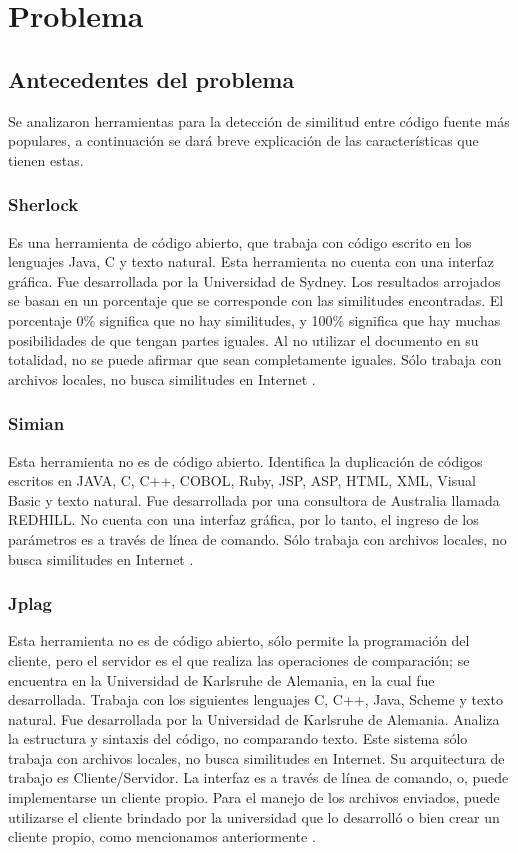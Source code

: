 \section{Problema}
\subsection{Antecedentes del problema}
Se analizaron herramientas para la detección de similitud entre código fuente más populares, a continuación se dará breve explicación de las características que tienen estas.
\subsubsection{Sherlock}
Es una herramienta de código abierto, que trabaja con código escrito en los lenguajes Java, C y texto natural. Esta herramienta no cuenta con una interfaz gráfica. Fue desarrollada por la Universidad de Sydney. Los resultados arrojados se basan en un porcentaje que se corresponde con las similitudes encontradas. El porcentaje 0\% significa que no hay similitudes, y 100\% significa que hay muchas posibilidades de que tengan partes iguales. Al no utilizar el documento en su totalidad, no se puede afirmar que sean completamente iguales. Sólo trabaja con archivos locales, no busca similitudes en Internet \cite{article1}.
\subsubsection{Simian}
Esta herramienta no es de código abierto. Identifica la duplicación de códigos escritos en JAVA, C, C++, COBOL, Ruby, JSP, ASP, HTML, XML, Visual Basic y texto natural. Fue desarrollada por una consultora de Australia llamada REDHILL. No cuenta con una interfaz gráfica, por lo tanto, el ingreso de los parámetros es a través de línea de comando. Sólo trabaja con archivos locales, no busca similitudes en Internet \cite{article1}.
\subsubsection{Jplag}
Esta herramienta no es de código abierto, sólo permite la programación del cliente, pero el servidor es el que realiza las operaciones de comparación; se encuentra en la Universidad de Karlsruhe de Alemania, en la cual fue desarrollada. Trabaja con los siguientes lenguajes C, C++, Java, Scheme y texto natural. Fue desarrollada por la Universidad de Karlsruhe de Alemania. Analiza la estructura y sintaxis del código, no comparando texto. Este sistema sólo trabaja con archivos locales, no busca similitudes en Internet. Su arquitectura de trabajo es Cliente/Servidor. La interfaz es a través de línea de comando, o, puede implementarse un cliente propio. Para el manejo de los archivos enviados, puede utilizarse el cliente brindado por la universidad que lo desarrolló o bien crear un cliente propio, como mencionamos anteriormente \cite{article1}.
